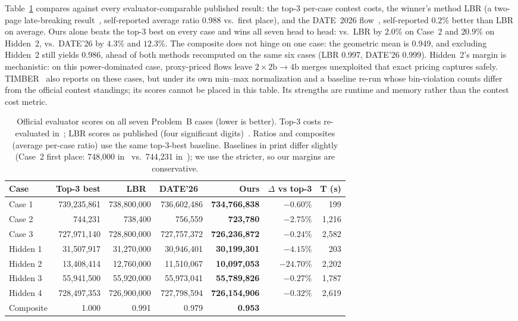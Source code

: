 Table~\ref{tab:main} compares against every evaluator-comparable published result: the top-3 per-case contest costs, the winner's method LBR (a two-page late-breaking result~\cite{li2025lbr}, self-reported average ratio 0.988 vs.\ first place), and the DATE~2026 flow~\cite{chen2026agile}, self-reported $0.2\%$ better than LBR on average. Ours alone beats the top-3 best on every case and wins all seven head to head: vs.\ LBR by $2.0\%$ on Case~2 and $20.9\%$ on Hidden~2, vs.\ DATE'26 by $4.3\%$ and $12.3\%$. The composite does not hinge on one case: the geometric mean is 0.949, and excluding Hidden~2 still yields 0.986, ahead of both methods recomputed on the same six cases (LBR 0.997, DATE'26 0.999). Hidden~2's margin is mechanistic: on this power-dominated case, proxy-priced flows leave $2{\times}2\mathrm{b}{\to}4\mathrm{b}$ merges unexploited that exact pricing captures safely. TIMBER~\cite{dassarma2026timber} also reports on these cases, but under its own min--max normalization and a baseline re-run whose bin-violation counts differ from the official contest standings; its scores cannot be placed in this table. Its strengths are runtime and memory rather than the contest cost metric.

\begin{table}[t]
\centering
\caption{Official evaluator scores on all seven Problem~B cases (lower is better). Top-3 costs re-evaluated in~\cite{chen2026agile}; LBR scores as published (four significant digits)~\cite{li2025lbr}. Ratios and composites (average per-case ratio) use the same top-3-best baseline. Baselines in print differ slightly (Case~2 first place: 748{,}000 in~\cite{li2025lbr} vs.\ 744{,}231 in~\cite{chen2026agile}); we use the stricter, so our margins are conservative.}
\label{tab:main}
\small
\begin{tabular}{@{}lrrrrrr@{}}
\toprule
Case & Top-3 best & LBR~\cite{li2025lbr} & DATE'26~\cite{chen2026agile} & Ours & $\Delta$ vs top-3 & T (s) \\
\midrule
Case 1   & 739{,}235{,}861 & 738{,}800{,}000 & 736{,}602{,}486 & \textbf{734{,}766{,}838} & $-0.60\%$ & 199 \\
Case 2   & 744{,}231       & 738{,}400       & 756{,}559       & \textbf{723{,}780}       & $-2.75\%$ & 1{,}216 \\
Case 3   & 727{,}971{,}140 & 728{,}800{,}000 & 727{,}757{,}372 & \textbf{726{,}236{,}872} & $-0.24\%$ & 2{,}582 \\
Hidden 1 & 31{,}507{,}917  & 31{,}270{,}000  & 30{,}946{,}401  & \textbf{30{,}199{,}301}  & $-4.15\%$ & 203 \\
Hidden 2 & 13{,}408{,}414  & 12{,}760{,}000  & 11{,}510{,}067  & \textbf{10{,}097{,}053}  & $-24.70\%$ & 2{,}202 \\
Hidden 3 & 55{,}941{,}500  & 55{,}920{,}000  & 55{,}973{,}041  & \textbf{55{,}789{,}826}  & $-0.27\%$ & 1{,}787 \\
Hidden 4 & 728{,}497{,}353 & 726{,}900{,}000 & 727{,}798{,}594 & \textbf{726{,}154{,}906} & $-0.32\%$ & 2{,}619 \\
\midrule
Composite & 1.000 & 0.991 & 0.979 & \textbf{0.953} & & \\
\bottomrule
\end{tabular}
\end{table}

